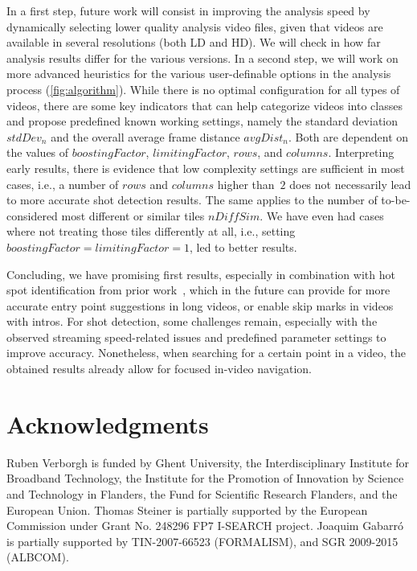 \documentclass{acm_proc_article-sp}
\begin{document}
In a first step, future work will consist in improving the analysis speed by dynamically selecting lower quality analysis video files, given that videos are available in several resolutions (both LD and HD). We will check in how far analysis results differ for the various versions. In a second step, we will work on more advanced heuristics for the various user-definable options in the analysis process (\autoref{fig:algorithm}). While there is no optimal configuration for all types of videos, there are some key indicators that can help categorize videos into classes and propose predefined known working settings, namely the standard deviation $\mathit{stdDev_{n}}$ and the overall average frame distance $\mathit{avgDist_{n}}$. Both are dependent on the values of $\mathit{boostingFactor}$, $\mathit{limitingFactor}$, $\mathit{rows}$, and $\mathit{columns}$. Interpreting early results, there is evidence that low complexity settings are sufficient in most cases, i.e., a number of $\mathit{rows}$ and $\mathit{columns}$ higher than~$\mathit{2}$ does not necessarily lead to more accurate shot detection results. The same applies to the number of to-be-considered most different or similar tiles $\mathit{nDiffSim}$. We have even had cases where not treating those tiles differently at all, i.e., setting $\mathit{boostingFactor} = \mathit{limitingFactor} = \mathit{1}$, led to better results.

Concluding, we have promising first results, especially in combination with hot spot identification from prior work~\cite{derive2011}, which in the future can provide for more accurate entry point suggestions in long videos, or enable skip marks in videos with intros.
For shot detection, some challenges remain, especially with the observed streaming speed-related issues and predefined parameter settings to improve accuracy. Nonetheless, when searching for a certain point in a video, the obtained results already allow for focused in-video navigation.

\section{Acknowledgments} 
Ruben Verborgh is funded by Ghent University, the Interdisciplinary Institute for Broadband Technology, the Institute for the Promotion of Innovation by Science and Technology in Flanders, the Fund for Scientific Research Flanders, and the European Union.
Thomas Steiner is partially supported by the European Commission under Grant No. 248296 FP7 \mbox{I-SEARCH} project.
Joaquim Gabarr\'o is partially supported by TIN-2007-66523 (FORMALISM), and SGR 2009-2015 (ALBCOM).




\balancecolumns
\end{document}
